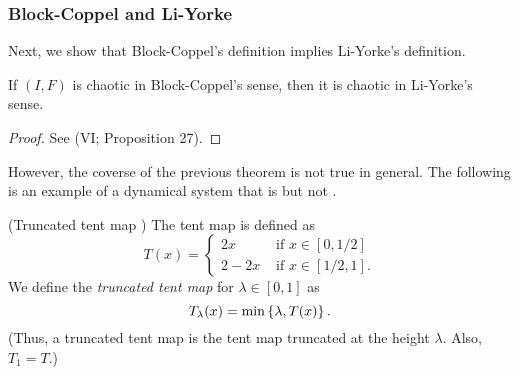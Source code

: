 \documentclass[10pt,twoside,draft]{book}
\begin{document}
\subsubsection*{Block-Coppel and Li-Yorke}
Next, we show that Block-Coppel's definition implies Li-Yorke's definition.
\begin{theorem}
  \citep{blockcoppel}
  If $(I,F)$ is chaotic in Block-Coppel's sense, then it is chaotic in Li-Yorke's sense.
  \label{thm:devaney-liyorke}
  \begin{proof}
    See \citet{blockcoppel} (VI; Proposition 27).
  \end{proof}
\end{theorem}
However, the coverse of the previous theorem is not true in general.
The following is an example of a dynamical system that is \liy but not \blcp.
\begin{example}
  (Truncated tent map \citep{aulbach})
  The tent map is defined as
  \begin{equation*}
    T(x) = 
    \begin{cases}
      2x     &\mbox{ if } x \in [0,1/2] \\
      2 - 2x &\mbox{ if } x \in [1/2,1].
    \end{cases}
  \end{equation*}
  We define the \textit{truncated tent map} for $\lambda \in [0,1]$ as 
  \begin{equation*}
    T_\lambda(x) = \min\left \{ \lambda, T(x) \right \}.
  \end{equation*}
  (Thus, a truncated tent map is the tent map truncated at the height $\lambda$.
  Also, $T_1 = T$.)

  \begin{figure}[th]
    \centering
\end{figure}
\end{example}
\end{document}
